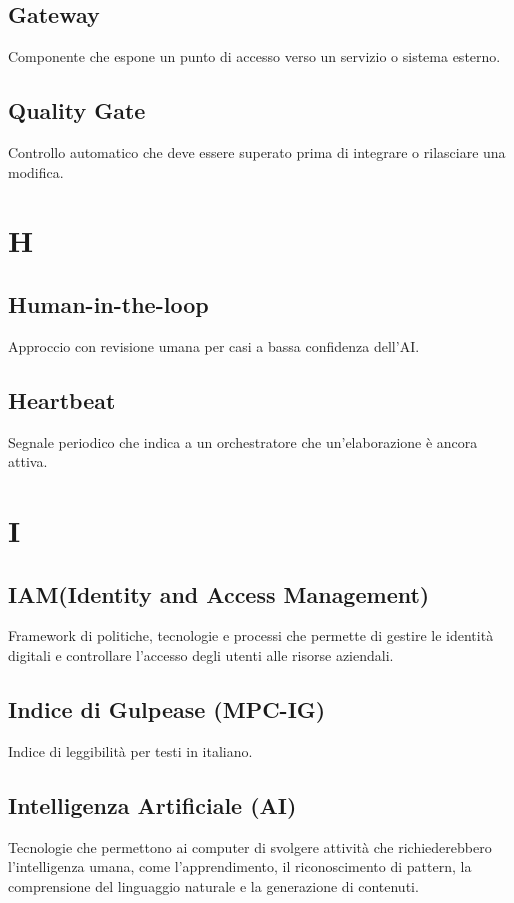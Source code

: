 \documentclass[a4paper,12pt]{article}
\begin{document}
\subsection{Gateway}
Componente che espone un punto di accesso verso un servizio o sistema esterno.

\subsection{Quality Gate}
Controllo automatico che deve essere superato prima di integrare o rilasciare una modifica.

\section{H}
\subsection{Human-in-the-loop}
Approccio con revisione umana per casi a bassa confidenza dell'AI.

\subsection{Heartbeat}
Segnale periodico che indica a un orchestratore che un'elaborazione è ancora attiva.

\section{I}

\subsection{IAM(Identity and Access Management)}
Framework di politiche, tecnologie e processi che permette di gestire le identità digitali e controllare l'accesso degli utenti alle risorse aziendali.

\subsection{Indice di Gulpease (MPC-IG)}
Indice di leggibilità per testi in italiano.

\subsection{Intelligenza Artificiale (AI)}
Tecnologie che permettono ai computer di svolgere attività che richiederebbero l'intelligenza umana, come l'apprendimento, il riconoscimento di pattern, la comprensione del linguaggio naturale e la generazione di contenuti.
\end{document}
